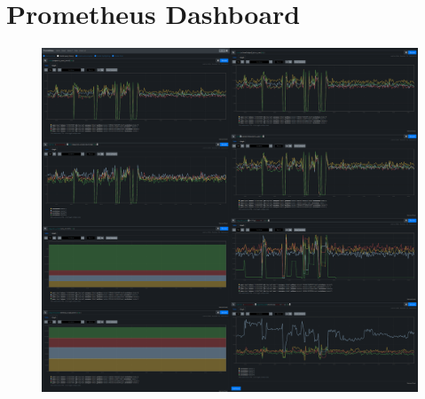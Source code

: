 \chapter{Prometheus Dashboard}\label{appendix:prometheus-dashboard}

\begin{figure}[H]
    \includegraphics[width=16.5cm]{assets/appendix/prometheus-dashboard.png}
\end{figure}